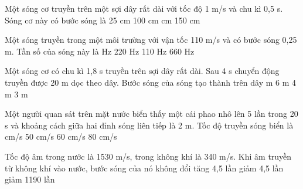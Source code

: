 \begin{vidu}%
Một sóng cơ truyền trên một sợi dây rất dài với tốc độ 1 m/s và chu kì 0,5 s. Sóng cơ này có bước sóng là
\choice
{25 cm}
{100 cm}
{ cm}
{150 cm}
\end{vidu} 
\begin{vidu}%
Một sóng truyền trong một môi trường với vận tốc 110  m/s và có bước sóng 0,25 m. Tần số của sóng này là 
\choice
{ Hz}
{220 Hz}
{110 Hz}
{660 Hz}
\end{vidu} 
\begin{vidu}%
Một sóng cơ có chu kì 1,8 s truyền trên sợi dây rất dài. Sau 4 s chuyển động truyền được 20 m dọc theo dây. Bước sóng của sóng tạo thành trên dây
\choice
{ m}
{6 m}
{4 m}
{3 m}
\end{vidu} 
\begin{vidu}%
Một người quan sát trên mặt nước biển thấy một cái phao nhô lên 5 lần trong 20 s và khoảng cách giữa hai đỉnh sóng liên tiếp là 2 m. Tốc độ truyền sóng biển là
\choice
{ cm/s}
{50 cm/s}
{60 cm/s}
{80 cm/s}
\end{vidu} 
\begin{vidu}%
Tốc độ âm trong nước là 1530 m/s, trong không khí là 340 m/s. Khi âm truyền từ không khí vào nước, bước sóng của nó
\choice
{không đổi}
{\True tăng 4,5 lần}
{giảm 4,5 lần}
{giảm 1190 lần}
\end{vidu} 
